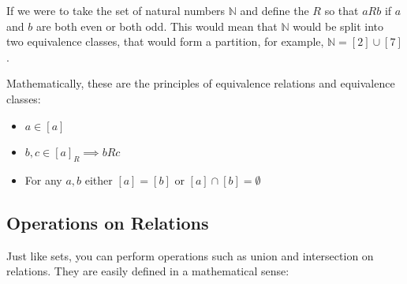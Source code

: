 
If we were to take the set of natural numbers $\mathbb{N}$ and define the $R$ so
that $aRb$ if $a$ and $b$ are both even or both odd. This would mean that
$\mathbb{N}$ would be split into two equivalence classes, that would form a
partition, for example, $\mathbb{N} = [2] \cup [7]$.

Mathematically, these are the principles of equivalence relations and
equivalence classes:

\begin{itemize}
	\item $a \in [a]$
	\item $b,c \in [a]_R \implies bRc$
	\item For any $a,b$ either $[a] = [b]$ or $[a] \cap [b] = \emptyset$
\end{itemize}

\subsection{Operations on Relations}

Just like sets, you can perform operations such as union and intersection on
relations. They are easily defined in a mathematical sense:

